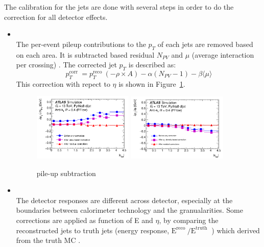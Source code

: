 The calibration for the jets are done with several steps in order to do the correction for all detector effects. 
\begin{itemize}
    \item \textbf{} \\
    The per-event pileup contributions to the $p_T$ of each jets are removed based on each area. It is subtracted based residual $N_{PV}$ and $\mu$ (average interaction per crossing) \cite{JETM-2018-05}.
    The corrected jet $p_T$ is described as:
    \begin{equation}
     p_{T}^{\text {corr }}=p_{T}^{\text {reco }}(-\rho \times A)-\alpha\left(N_{P V}-1\right)-\beta\langle\mu\rangle
    \end{equation}
    This correction with repect to $\eta$ is shown in Figure~\ref{fig:pileup}.
    \begin{figure}[tbp]
    \begin{center}
    \includegraphics[width=0.45\textwidth,keepaspectratio]{figures/Reconstruction/intimepileup}
    \includegraphics[width=0.45\textwidth,keepaspectratio]{figures/Reconstruction/outtimepileup}
    \caption{
    pile-up subtraction \cite{JETM-2018-05}
    }
    \label{fig:pileup}
    \end{center}
    \end{figure}
    \item \textbf{} \\
    The detector responses are different across detector, especially at the boundaries between calorimeter technology and the granualarities. Some corrections are applied as function of E and $\eta$, by comparing the reconstructed jets to truth jets (energy response, $\mathrm{E}^{\text {reco }} / \mathrm{E}^{\text {truth }}$ ) which derived from the truth MC \cite{JETM-2018-05}.

\end{itemize}
